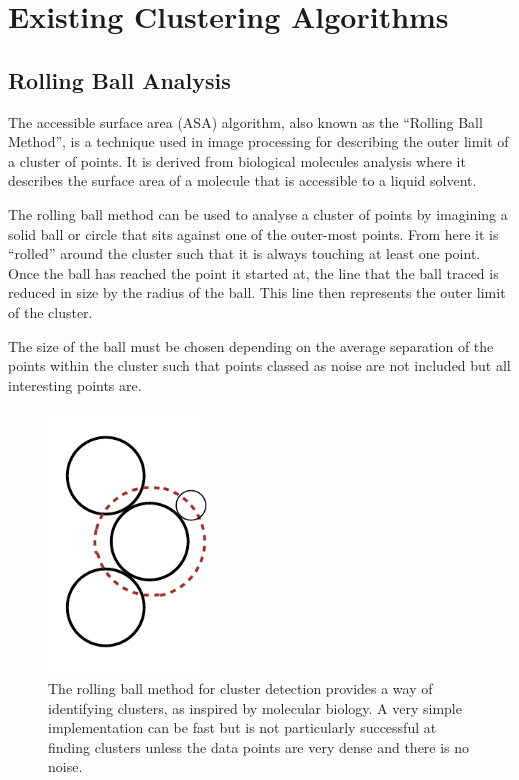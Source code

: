 
\section{Existing Clustering Algorithms}
\label{sec:existing_clustering_algorithms}


\subsection{Rolling Ball Analysis}
\label{sub:rolling_ball_analysis}

The accessible surface area (ASA) algorithm, also known as the ``Rolling Ball
Method'', is a technique used in image processing for describing the outer
limit of a cluster of points. It is derived from biological molecules analysis
where it describes the surface area of a molecule that is accessible to a
liquid solvent.

The rolling ball method can be used to analyse a cluster of points by imagining
a solid ball or circle that sits against one of the outer-most points. From
here it is ``rolled'' around the cluster such that it is always touching at
least one point. Once the ball has reached the point it started at, the line
that the ball traced is reduced in size by the radius of the ball. This line
then represents the outer limit of the cluster.

The size of the ball must be chosen depending on the average separation of the
points within the cluster such that points classed as noise are not included
but all interesting points are.

\begin{figure}[tbhp]
	\centering
	\includegraphics[width=4.2cm]{rolling-ball.pdf}

	\caption[Rolling ball method for cluster analysis.]{The rolling ball method
		for cluster detection provides a way of identifying clusters, as
		inspired by molecular biology. A very simple implementation can be fast
		but is not particularly successful at finding clusters unless the data
		points are very dense and there is no noise.}\label{fig:rolling-ball}
\end{figure}


